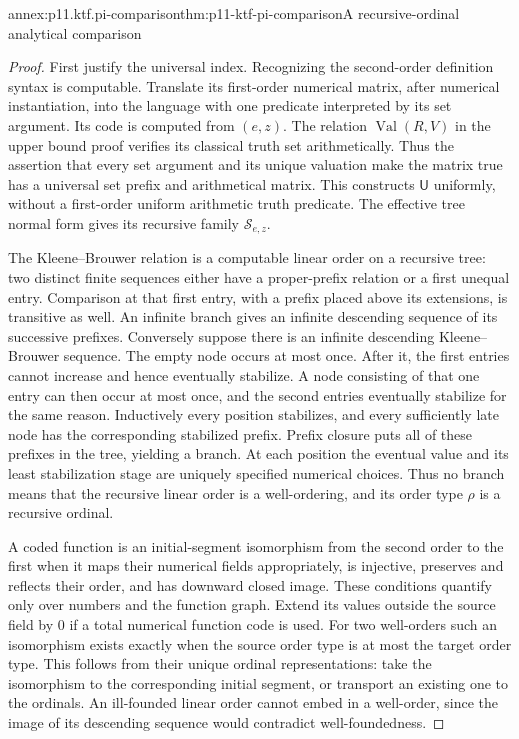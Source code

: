\begin{annexitem}{annex:p11.ktf.pi-comparison}{thm:p11-ktf-pi-comparison}{A recursive-ordinal analytical comparison}
\begin{proof}
First justify the universal index. Recognizing the second-order
definition syntax is computable. Translate its first-order numerical
matrix, after numerical instantiation, into the language with one
predicate interpreted by its set argument. Its code is computed from
\((e,z)\). The relation \(\operatorname{Val}(R,V)\) in the upper
bound proof verifies its classical truth set arithmetically. Thus the
assertion that every set argument and its unique valuation make the
matrix true has a universal set prefix and arithmetical matrix.
This constructs \(\mathsf U\) uniformly, without a first-order
uniform arithmetic truth predicate. The effective tree normal form
gives its recursive family \(\mathcal S_{e,z}\).

The Kleene--Brouwer relation is a computable linear order on a recursive
tree: two distinct finite sequences either have a proper-prefix
relation or a first unequal entry. Comparison at that first entry,
with a prefix placed above its extensions, is transitive as well.
An infinite branch gives an infinite descending sequence of its
successive prefixes. Conversely suppose there is an infinite
descending Kleene--Brouwer sequence. The empty node occurs at most
once. After it, the first entries cannot increase and hence eventually
stabilize. A node consisting of that one entry can then occur at most
once, and the second entries eventually stabilize for the same reason.
Inductively every position stabilizes, and every sufficiently late
node has the corresponding stabilized prefix. Prefix closure puts
all of these prefixes in the tree, yielding a branch. At each position
the eventual value and its least stabilization stage are uniquely
specified numerical choices. Thus no branch means that the recursive
linear order is a well-ordering, and its order type \(\rho\) is
a recursive ordinal.

A coded function is an initial-segment isomorphism from the second
order to the first when it maps their numerical fields appropriately,
is injective, preserves and reflects their order, and has downward
closed image. These conditions quantify only over numbers and the
function graph. Extend its values outside the source field by \(0\)
if a total numerical function code is used. For two well-orders such
an isomorphism exists exactly when the source order type is at most
the target order type. This follows from their unique ordinal
representations: take the isomorphism to the corresponding initial
segment, or transport an existing one to the ordinals. An ill-founded
linear order cannot embed in a well-order, since the image of its
descending sequence would contradict well-foundedness.


\end{proof}
\end{annexitem}
